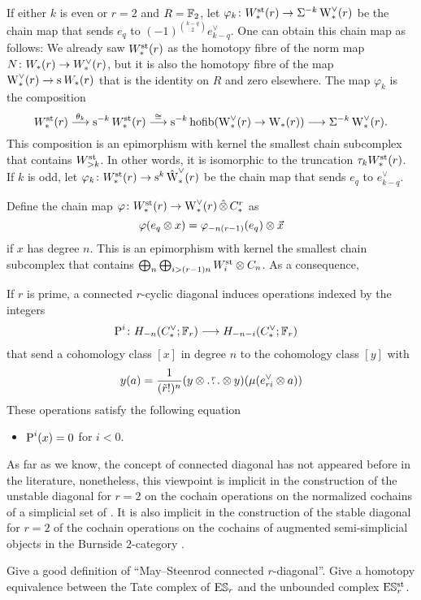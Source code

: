 If either $k$ is even or $r=2$ and $R=\bF_2$, let $\varphi_k \colon \Wst(r) \to \susp{-k}\rWd(r)$ be the chain map that sends $e_q$ to $(-1)^{\binom{k-q}{2}}e_{k-q}^{\vee}$.
One can obtain this chain map as follows: We already saw $\Wst(r)$ as the homotopy fibre of the norm map $N \colon \W(r) \to \Wd(r)$, but it is also the homotopy fibre of the map $\rWd(r) \to \sus{}\W(r)$ that is the identity on $R$ and zero elsewhere.
The map $\varphi_k$ is the composition
\[
\Wst(r)\overset{\theta_k}{\lra} \sus{-k} \Wst(r) \overset{\cong}{\lra} \sus{-k}\hofib(\rWd(r) \to \rW(r)) \lra \susp{-k}\rWd(r).
\]
This composition is an epimorphism with kernel the smallest chain subcomplex that contains $\Wst[>k]$.
In other words, it is isomorphic to the truncation $\tau_k \Wst(r)$.
If $k$ is odd, let $\varphi_k \colon \Wst(r) \to \sus{k}\rWhatd(r)$ be the chain map that sends $e_q$ to $e_{k-q}^{\vee}$.

Define the chain map $\varphi \colon \Wst(r) \to \rWd(r) \hotimes \rucadenas$ as
\[
\varphi(e_q \ot x) = \varphi_{-n(r-1)}(e_{q}) \ot \vec{x}
\]
if $x$ has degree $n$.
This is an epimorphism with kernel the smallest chain subcomplex that contains $\bigoplus_n\bigoplus_{i>(r-1)n} \Wst[i] \ot \ucadenas[n]$.
As a consequence,

\begin{proposition}
	If $r$ is prime, a connected $r$-cyclic diagonal induces operations indexed by the integers
	\begin{align*}
		\power^{i} \colon H_{-n}(\ucocadenas;\mathbb{F}_r)& \lra H_{-n-i}(\ucocadenas;\mathbb{F}_r)
	\end{align*}
	that send a cohomology class $[x]$ in degree $n$ to the cohomology class $[y]$ with
	\[
	y(a) = \frac{1}{(\tilde{r}!)^n}(y \ot \overset{r}{\dots} \ot y)(\mu(e_{ri}^\vee \ot a))
	\]
	These operations satisfy the following equation
	\begin{itemize}
		\item $\power^i(x) = 0$ for $i<0$.
	\end{itemize}
\end{proposition}

\begin{example}
	As far as we know, the concept of connected diagonal has not appeared before in the literature, nonetheless, this viewpoint is implicit in the construction of the unstable diagonal for $r=2$ on the cochain operations on the normalized cochains of a simplicial set of \cite{medina2021fast_sq}.
	It is also implicit in the construction of the stable diagonal for $r=2$ of the cochain operations on the cochains of augmented semi-simplicial objects in the Burnside $2$-category \cite{cantero-moran2020khovanov}.
\end{example}

\begin{question}
	Give a good definition of ``May--Steenrod connected $r$-diagonal''.
	Give a homotopy equivalence between the Tate complex of $\ES_r$ and the unbounded complex $\ESst_r$.
\end{question}